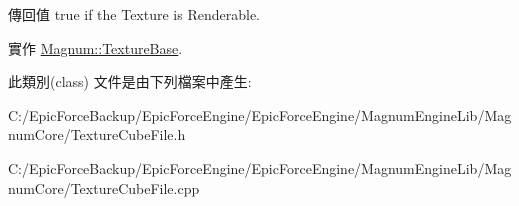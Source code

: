 \begin{DoxyReturn}{傳回值}
true if the Texture is Renderable. 
\end{DoxyReturn}


實作 \hyperlink{class_magnum_1_1_texture_base_a7e4d11ffd40d1a83e8838b5fc60cc4c2}{Magnum\+::\+Texture\+Base}.



此類別(class) 文件是由下列檔案中產生\+:\begin{DoxyCompactItemize}
\item 
C\+:/\+Epic\+Force\+Backup/\+Epic\+Force\+Engine/\+Epic\+Force\+Engine/\+Magnum\+Engine\+Lib/\+Magnum\+Core/Texture\+Cube\+File.\+h\item 
C\+:/\+Epic\+Force\+Backup/\+Epic\+Force\+Engine/\+Epic\+Force\+Engine/\+Magnum\+Engine\+Lib/\+Magnum\+Core/Texture\+Cube\+File.\+cpp\end{DoxyCompactItemize}
